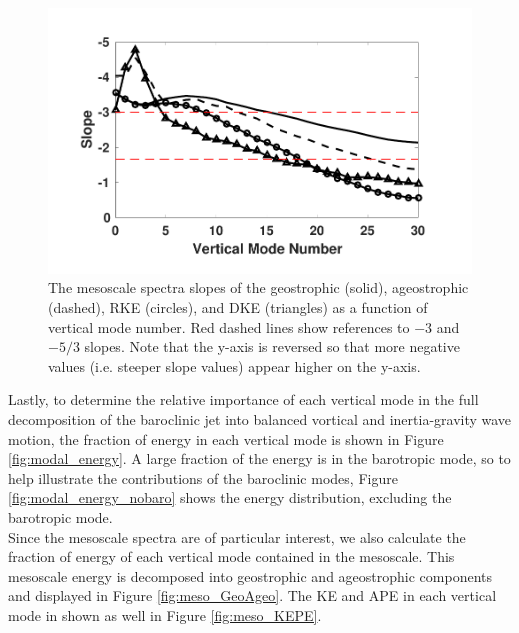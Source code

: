 \begin{figure}[H]
\includegraphics[scale=1]{Chapter4/img/slopes}
\caption{The mesoscale spectra slopes of the geostrophic (solid), ageostrophic (dashed), RKE (circles), and DKE (triangles) as a function of vertical mode number. Red dashed lines show references to $-3$ and $-5/3$ slopes. Note that the y-axis is reversed so that more negative values (i.e. steeper slope values) appear higher on the y-axis.}
\label{fig:slopes}
\end{figure}

Lastly, to determine the relative importance of each vertical mode in the full decomposition of the baroclinic jet into balanced vortical and inertia-gravity wave motion, the fraction of energy in each vertical mode is shown in Figure \ref{fig:modal_energy}. A large fraction of the energy is in the barotropic mode, so to help illustrate the contributions of the baroclinic modes, Figure \ref{fig:modal_energy_nobaro} shows the energy distribution, excluding the barotropic mode.\\

Since the mesoscale spectra are of particular interest, we also calculate the fraction of energy of each vertical mode contained in the mesoscale. This mesoscale energy is decomposed into geostrophic and ageostrophic components and displayed in Figure \ref{fig:meso_GeoAgeo}. The KE and APE in each vertical mode in shown as well in Figure \ref{fig:meso_KEPE}.

